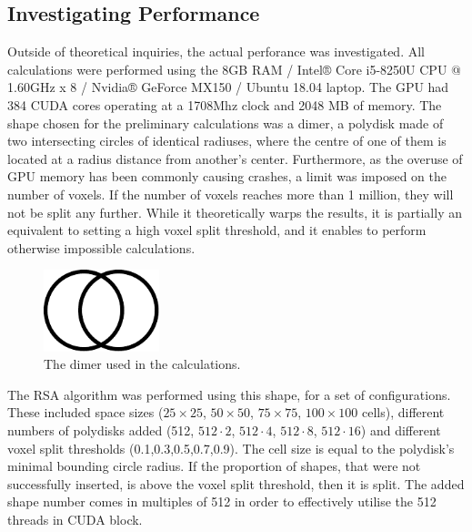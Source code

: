 \documentclass[12pt, oneside]{report}
\begin{document}
\subsection{Investigating Performance}

Outside of theoretical inquiries, the actual perforance was investigated. All calculations were performed using the 8GB RAM / Intel® Core i5-8250U CPU @ 1.60GHz x 8 / Nvidia® GeForce MX150 / Ubuntu 18.04 laptop. The GPU had 384 CUDA cores operating at a 1708Mhz clock and 2048 MB of memory. \newline
The shape chosen for the preliminary calculations was a dimer, a polydisk made of two intersecting circles of identical radiuses, where the centre of one of them is located at a radius distance from another's center. Furthermore, as the overuse of GPU memory has been commonly causing crashes, a limit was imposed on the number of voxels. If the number of voxels reaches more than 1 million, they will not be split any further. While it theoretically warps the results, it is partially an equivalent to setting a high voxel split threshold, and it enables to perform otherwise impossible calculations.

\begin{figure}[H]
  \centering
	\includegraphics[width=0.3\textwidth,keepaspectratio]{Images/SummaryOptimisation/dimer.pdf}
	\caption{The dimer used in the calculations.}
	\label{summary_dimer}
\end{figure}
The RSA algorithm was performed using this shape, for a set of configurations. These included space sizes ($25 \times 25$, $50 \times 50$, $75 \times 75$, $100 \times 100$ cells), different numbers of polydisks added (512, $512 \cdot 2$, $512 \cdot 4$, $512 \cdot 8$, $512 \cdot 16$) and different voxel split thresholds (0.1,0.3,0.5,0.7,0.9). The cell size is equal to the polydisk's minimal bounding circle radius.
If the proportion of shapes, that were not successfully inserted, is above the voxel split threshold, then it is split. The added shape number comes in multiples of 512 in order to effectively utilise the 512 threads in CUDA block.
\end{document}
